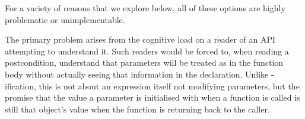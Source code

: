 For a variety of reasons that we explore below, all of these options are highly problematic or unimplementable.

\pagebreak

The primary problem arises from the cognitive load on a reader of an API attempting to understand it.  Such readers would be forced to, when reading a postcondition, understand that parameters will be treated as  in the function body without actually seeing that information in the declaration.  Unlike -ification, this is not about an expression itself not modifying parameters, but the promise that the value a parameter is initialised with when a function is called is still that object's value when the function is returning back to the caller.


